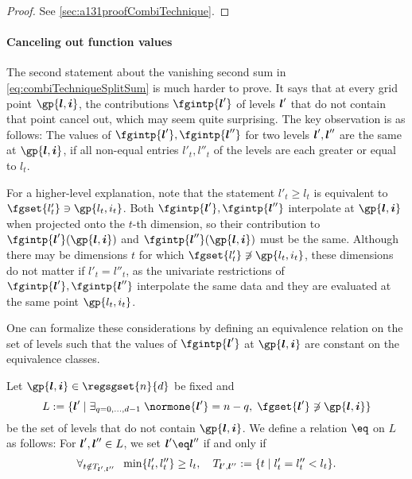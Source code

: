 \begin{proof}
  See \cref{sec:a131proofCombiTechnique}.
\end{proof}

\paragraph{Canceling out function values}

The second statement about the vanishing second sum in
\eqref{eq:combiTechniqueSplitSum} is much harder to prove.
It says that at every grid point $\gp{\*l,\*i}$,
the contributions $\fgintp{\*l'}$ of levels ${\boldsymbol{l}}'$
that do not contain that point cancel out,
which may seem quite surprising.
The key observation is as follows:
The values of $\fgintp{\*l'}, \fgintp{\*l''}$ for two levels
${\boldsymbol{l}}', {\boldsymbol{l}}''$ are the same at $\gp{\*l,\*i}$,
if all non-equal entries $l'_t, l''_t$ of the levels are
each greater or equal to $l_t$.

For a higher-level explanation,
note that the statement $l'_t \ge l_t$ is equivalent to
$\fgset{l'_t} \ni \gp{l_t,i_t}$.
Both $\fgintp{\*l'}, \fgintp{\*l''}$ interpolate at
$\gp{\*l,\*i}$ when projected onto the $t$-th dimension,
so their contribution to $\fgintp{\*l'}(\gp{\*l,\*i})$ and
$\fgintp{\*l''}(\gp{\*l,\*i})$ must be the same.
Although there may be dimensions $t$ for which
$\fgset{l'_t} \notni \gp{l_t,i_t}$,
these dimensions do not matter if $l'_t = l''_t$,
as the univariate restrictions of $\fgintp{\*l'}, \fgintp{\*l''}$
interpolate the same data and they are evaluated at the same point
$\gp{l_t,i_t}$.

One can formalize these considerations by defining an
equivalence relation on the set of levels such that the values of
$\fgintp{\*l'}$ at $\gp{\*l,\*i}$ are constant
on the equivalence classes.

\begin{definition}
  \label{def:combiTechniqueEquivalenceRelation}
  Let $\gp{\*l,\*i} \in \regsgset{n}{d}$ be fixed and
  \begin{equation}
    \label{eq:combiTechniqueSpecialLevelSet}
    L
    := \{\*l' \mid \ex{q=0,\dotsc,d-1}{
      \normone{\*l'} = n - q,\; \fgset{\*l'} \notni \gp{\*l,\*i}
    }\}
  \end{equation}
  be the set of levels that do not contain $\gp{\*l,\*i}$.
  We define a relation $\eq$ on $L$ as follows:
  For ${\boldsymbol{l}}', {\boldsymbol{l}}'' \in L$, we set $\*l' \eq \*l''$ if and only if
  \begin{equation}
    \forall_{t \notin T_{{\boldsymbol{l}}',{\boldsymbol{l}}''}}\;\;\min\{l'_t, l''_t\} \ge l_t,\quad
    T_{{\boldsymbol{l}}',{\boldsymbol{l}}''}
    := \{t \mid l'_t = l''_t < l_t\}.
  \end{equation}
\end{definition}

